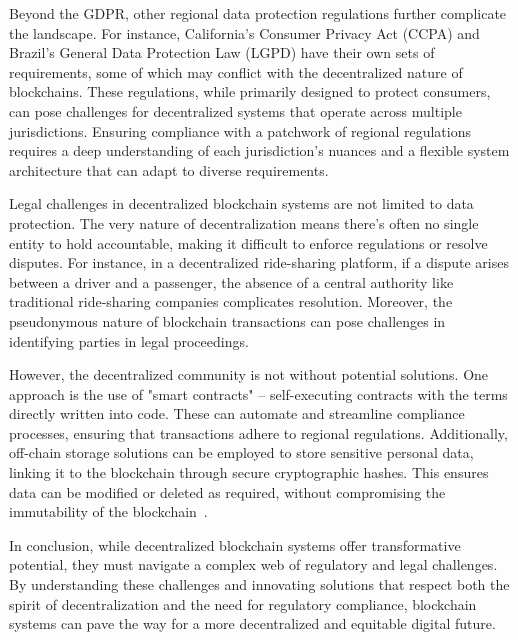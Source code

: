 Beyond the GDPR, other regional data protection regulations further complicate the landscape. For instance, California's Consumer Privacy Act (CCPA) and Brazil's General Data Protection Law (LGPD) have their own sets of requirements, some of which may conflict with the decentralized nature of blockchains. These regulations, while primarily designed to protect consumers, can pose challenges for decentralized systems that operate across multiple jurisdictions. Ensuring compliance with a patchwork of regional regulations requires a deep understanding of each jurisdiction's nuances and a flexible system architecture that can adapt to diverse requirements.

Legal challenges in decentralized blockchain systems are not limited to data protection. The very nature of decentralization means there's often no single entity to hold accountable, making it difficult to enforce regulations or resolve disputes. For instance, in a decentralized ride-sharing platform, if a dispute arises between a driver and a passenger, the absence of a central authority like traditional ride-sharing companies complicates resolution. Moreover, the pseudonymous nature of blockchain transactions can pose challenges in identifying parties in legal proceedings.

However, the decentralized community is not without potential solutions. One approach is the use of "smart contracts" – self-executing contracts with the terms directly written into code. These can automate and streamline compliance processes, ensuring that transactions adhere to regional regulations. Additionally, off-chain storage solutions can be employed to store sensitive personal data, linking it to the blockchain through secure cryptographic hashes. This ensures data can be modified or deleted as required, without compromising the immutability of the blockchain~\cite{Schwerin.2018}.

In conclusion, while decentralized blockchain systems offer transformative potential, they must navigate a complex web of regulatory and legal challenges. By understanding these challenges and innovating solutions that respect both the spirit of decentralization and the need for regulatory compliance, blockchain systems can pave the way for a more decentralized and equitable digital future.
